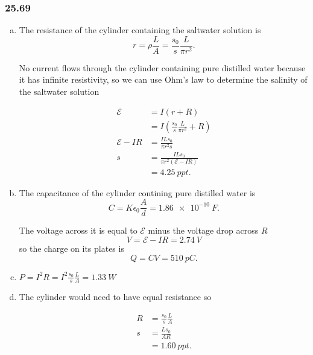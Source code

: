 \documentclass{article}
\begin{document}
\subsubsection{25.69}

\begin{enumerate}[(a)]
  \item The resistance of the cylinder containing the saltwater solution is \[r = \rho \frac{L}{A} = \frac{s_0}{s} \frac{L}{\pi r^2}.\]

        No current flows through the cylinder containing pure distilled water because it has infinite resistivity, so we can use Ohm's law to determine the salinity of the saltwater solution

        \begin{align*}
          \mathcal{E}       & = I (r + R)                                            \\
                            & = I \left( \frac{s_0}{s} \frac{L}{\pi r^2} + R \right) \\
          \mathcal{E} - I R & = \frac{I L s_0}{\pi r^2 s}                            \\
          s                 & = \frac{I L s_0}{\pi r^2 (\mathcal{E} - I R)}          \\
                            & = \qty{4.25}{ppt}.
        \end{align*}

  \item The capacitance of the cylinder contining pure distilled water is \[C = K \epsilon_0 \frac{A}{d} = \qty{1.86e-10}{F}.\]

        The voltage across it is equal to $\mathcal{E}$ minus the voltage drop across $R$ \[V = \mathcal{E} - I R = \qty{2.74}{V}\] so the charge on its plates is \[Q = C V = \qty{510}{pC}.\]

  \item $P = I^2 R = I^2 \frac{s_0}{s} \frac{L}{A} = \qty{1.33}{W}$

  \item The cylinder would need to have equal resistance so

        \begin{align*}
          R & = \frac{s_0}{s} \frac{L}{A} \\
          s & = \frac{L s_0}{A R}         \\
            & = \qty{1.60}{ppt}.
        \end{align*}
\end{enumerate}
\end{document}
